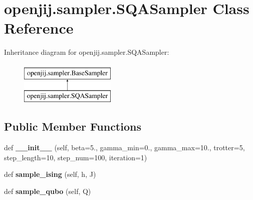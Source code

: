 \hypertarget{classopenjij_1_1sampler_1_1_s_q_a_sampler}{}\section{openjij.\+sampler.\+S\+Q\+A\+Sampler Class Reference}
\label{classopenjij_1_1sampler_1_1_s_q_a_sampler}
Inheritance diagram for openjij.\+sampler.\+S\+Q\+A\+Sampler\+:\begin{figure}[H]
\begin{center}
\leavevmode
\includegraphics[height=2.000000cm]{classopenjij_1_1sampler_1_1_s_q_a_sampler}
\end{center}
\end{figure}
\subsection*{Public Member Functions}
\begin{DoxyCompactItemize}
\item 
\mbox{\label{classopenjij_1_1sampler_1_1_s_q_a_sampler_aa923ed240ab7e7eeb68d695e18787194}} 
def {\bfseries \+\_\+\+\_\+init\+\_\+\+\_\+} (self, beta=5., gamma\+\_\+min=0., gamma\+\_\+max=10., trotter=5, step\+\_\+length=10, step\+\_\+num=100, iteration=1)
\item 
\mbox{\label{classopenjij_1_1sampler_1_1_s_q_a_sampler_a2ebfe12ea75b588d8f3197a7830c6fda}} 
def {\bfseries sample\+\_\+ising} (self, h, J)
\item 
\mbox{\label{classopenjij_1_1sampler_1_1_s_q_a_sampler_a71e82c9a53b45ba1c3ac05e3961622dc}} 
def {\bfseries sample\+\_\+qubo} (self, Q)
\end{DoxyCompactItemize}
